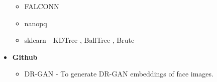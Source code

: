 \documentclass[12pt]{article}
\renewcommand{\_}{\kern-1.5pt\textunderscore\kern-1.5pt}
\begin{document}
\begin{itemize}
\begin{itemize}
    	\item FALCONN \cite{andoni2015practical}
    	\item nanopq \cite{5432202,6678503}
    	\item sklearn - KDTree \cite{panigrahy2008improved}, BallTree \cite{dolatshah2015ball}, Brute
    \end{itemize}
	\item \textbf{Github}
    \begin{itemize}
    	\item DR-GAN - To generate DR-GAN embeddings of face images.  \cite{tran2017disentangled} 
    \end{itemize}
\end{itemize}\par


\vspace{\baselineskip}
\end{document}
